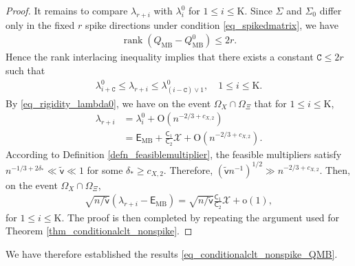 \documentclass[12pt]{article}
\theoremstyle{plain}
\numberwithin{equation}{section}
\begin{document}
\begin{proof}
	It remains to compare $\lambda_{r+i}$ with $\lambda_i^0$ for $1\leq i\leq \mathrm{K}$. Since $\Sigma$ and $\Sigma_0$ differ only in the fixed $r$ spike directions under condition \eqref{eq_spikedmatrix}, we have
	\begin{align*}
		\operatorname{rank}(Q_{\mathrm{MB}}-Q_{\mathrm{MB}}^0)\le 2r.
	\end{align*}
	Hence the rank interlacing inequality implies that there exists a constant $\mathtt C\le 2r$ such that
	\begin{align*}
		\lambda_{i+\mathtt C}^0\leq\lambda_{r+i}\leq\lambda_{(i-\mathtt C)\vee 1}^0,\quad 1\leq i\leq \mathrm{K}.
	\end{align*}
	By \eqref{eq_rigidity_lambda0}, we have on the event $\Omega_X\cap\Omega_{\Xi}$ that for $1\leq i\leq \mathrm{K}$,
	\begin{align*}
		\lambda_{r+i}&=\lambda_i^0+\mathrm{O}(n^{-2/3+c_{X,2}})\\
		&=\mathsf{E}_{\mathrm{MB}}+\frac{\mathsf{C}_1}{\mathsf{C}_2}\mathcal{X}+\mathrm{O}(n^{-2/3+c_{X,2}}).
	\end{align*}
	According to Definition \ref{defn_feasiblemultiplier}, the feasible multipliers satisfy $n^{-1/3+2\delta_{*}}\ll \tilde{\mathsf{v}}\ll 1$ for some $\delta_{*}\ge c_{X,2}$. Therefore, $(\tilde{\mathsf{v}}n^{-1})^{1/2}\gg n^{-2/3+c_{X,2}}$. Then, on the event $\Omega_X\cap\Omega_{\Xi}$,
	\begin{align*}
		\sqrt{n/\tilde{\mathsf{v}}}(\lambda_{r+i}-\mathsf{E}_{\mathrm{MB}})=\sqrt{n/\tilde{\mathsf{v}}}\frac{\mathsf{C}_1}{\mathsf{C}_2}\mathcal{X}+\mathrm{o}(1),
	\end{align*}
	for $1\leq i\leq \mathrm{K}$. The proof is then completed by repeating the argument used for Theorem \ref{thm_conditionalclt_nonspike}.
\end{proof}
We have therefore established the results \eqref{eq_conditionalclt_nonspike_QMB}.
\end{document}
